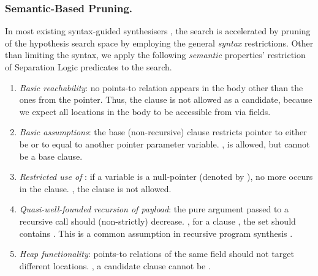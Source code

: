 \subsubsection{Semantic-Based Pruning.}
\label{sec:semantics}

In most existing syntax-guided synthesisers \cite{cropper2021learning,Alur-al:FMCAD13,Si-al:FSE18}, the search is accelerated by pruning of the hypothesis search
space by employing the general \emph{syntax}
restrictions.
%
Other than limiting the syntax, we apply the following \emph{semantic}
properties' restriction of Separation Logic predicates to the search.
%
%
\begin{enumerate}
  \item \emph{Basic reachability}: no points-to relation appears in the
    body other than the ones from the  pointer. Thus, the clause  is not 
    allowed as a candidate, because we expect all locations in the body to be
    accessible from  via fields.
  \item \emph{Basic assumptions}: the base (non-recursive) clause
    restricts  pointer to either be  or to equal to
    another pointer parameter variable. \Eg,  is allowed, but  cannot be a base clause.
  \item \emph{Restricted use of} : if a variable  is
    a null-pointer (denoted by ), no
    more  occurs in the clause. \Eg, the clause 
    is not allowed.
  \item \emph{Quasi-well-founded recursion of payload}: the pure argument passed to a
    recursive call should (non-strictly) decrease. \Eg, for a clause
    , the set  should contains . This
    is a common assumption in recursive program synthesis \cite{albarghouthi2013recursive,lee2021combining}.
  \item \emph{Heap functionality}: points-to relations of the same field
    should not target different locations. \Eg, a candidate clause cannot be .
  \end{enumerate}

